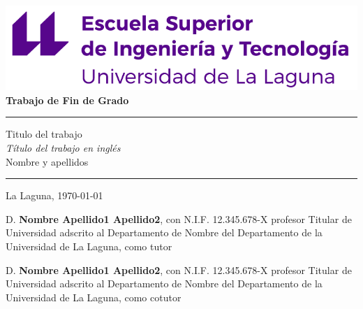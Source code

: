 \documentclass[a4paper,12pt,oneside]{report}
\begin{document}
\renewcommand\listtablename{Índice de Tablas}    
\renewcommand\listfigurename{Índice de Figuras}    

\pagestyle{empty}
\thispagestyle{empty}


\newcommand{\HRule}{\rule{\linewidth}{1mm}}
\setlength{\parindent}{0mm}
\setlength{\parskip}{0mm}


\begin{center}
\includegraphics[scale=0.8]{images/escuela-ingenieria-tecnologia-original}\\[10mm]
{\Huge\bf  Trabajo de Fin de Grado}
\end{center}

\HRule
\begin{flushright}
        {\Huge Titulo del trabajo} \\[2.5mm]
        {\Large \textit{Título del trabajo en inglés}} \\[5mm]
        {\Large Nombre y apellidos} \\[5mm]


\end{flushright}
\HRule
{}
\begin{center}
  \Large La Laguna, \today
\end{center}

\setlength{\parindent}{5mm}

\newpage
\thispagestyle{empty}

D. {\bf Nombre Apellido1 Apellido2}, con N.I.F. 12.345.678-X profesor Titular de Universidad adscrito al Departamento de Nombre del Departamento de la Universidad de La Laguna, como tutor

\bigskip
D. {\bf Nombre Apellido1 Apellido2}, con N.I.F. 12.345.678-X profesor Titular de Universidad adscrito al Departamento de Nombre del Departamento de la Universidad de La Laguna, como cotutor\pagestyle{empty}
\end{document}
